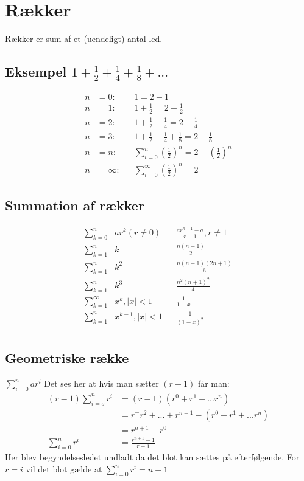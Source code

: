 \documentclass[12pt, a4paper]{article}
\begin{document}
\section{Rækker}
	Rækker er sum af et (uendeligt) antal led.
	\subsection{Eksempel $1+\frac{1}{2}+\frac{1}{4}+\frac{1}{8}+...$}
		\begin{align*}
			n&=0: &&1=2-1\\
			n&=1: &&1+\frac{1}{2}=2-\frac{1}{2}\\
			n&=2: &&1+\frac{1}{2}+\frac{1}{4}=2-\frac{1}{4}\\
			n&=3: &&1+\frac{1}{2}+\frac{1}{4}+\frac{1}{8}=2-\frac{1}{8}\\
			n&=n: &&\sum\limits_{i=0}^n(\frac{1}{2})^n=2-(\frac{1}{2})^n\\
			n&=\infty: &&\sum\limits_{i=0}^\infty (\frac{1}{2})^n=2
		\end{align*}
	\subsection{Summation af rækker}
		\begin{align*}
			\sum\limits_{k=0}^n&ar^k(r\neq 0) &&\frac{ar^{n+1}-a}{r-1}, r\neq 1\\
			\sum\limits_{k=1}^n&k &&\frac{n(n+1)}{2}\\
			\sum\limits_{k=1}^n&k^2 &&\frac{n(n+1)(2n+1)}{6}\\
			\sum\limits_{k=1}^n&k^3 &&\frac{n^2(n+1)^2}{4}\\
			\sum\limits_{k=1}^\infty&x^k,|x|<1 &&\frac{1}{1-x}\\
			\sum\limits_{k=1}^n&x^{k-1},|x|<1 &&\frac{1}{(1-x)^2}\\
		\end{align*}
	\subsection{Geometriske række}
		$\sum\limits_{i=0}^nar^i$
		Det ses her at hvis man sætter $(r-1)$ får man:\\
		\begin{align*}
			(r-1)\sum\limits_{i=o}^nr^i&=(r-1)(r^0+r^1+...r^n)\\
						   &=r^=r^2+...+r^{n+1}-(r^0+r^1+...r^n)\\
						   &=r^{n+1}-r^0\\
			\sum\limits_{i=0}^nr^i&=\frac{r^{n+1}-1}{r-1}
		\end{align*}
		Her blev begyndelsesledet undladt da det blot kan sættes på efterfølgende.
		For $r=i$ vil det blot gælde at $\sum\limits_{i=0}^nr^i=n+1$
\end{document}
